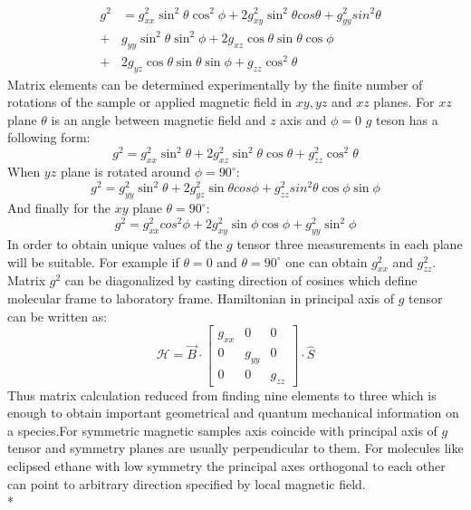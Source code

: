 \begin{equation}\label{eq:gtengeneral}
\begin{array} {lcl} &g^2& = g_{xx}^2\sin^2\theta\cos^2\phi+2g_{xy}^2\sin^2\theta cos\theta+g_{yy}^2sin^2\theta\\ & + & g_{yy}\sin^2\theta\sin^2\phi+2g_{xz}\cos\theta\sin\theta\cos\phi\\ & + & 2g_{yz}\cos\theta\sin\theta\sin\phi+g_{zz}\cos^2\theta \end{array}
\end{equation}
Matrix elements can be determined experimentally by the finite number of rotations of the sample or applied magnetic field in $xy,yz$ and $xz$ planes. For $xz$ plane $\theta$ is an angle between magnetic field and $z$ axis and $\phi=0$ $g$ teson has a following form:  
\begin{equation}\label{eq:22}
g^2=g_{xx}^2\sin^2\theta+2g_{xz}^2\sin^2\theta \cos\theta+g_{zz}^2\cos^2\theta
\end{equation} 
When $yz$ plane is rotated around $\phi=90^{\circ}$:
\begin{equation}\label{eq:newone22}
g^2=g_{yy}^2\sin^2\theta+2g_{yz}^2\sin\theta cos\phi+g_{zz}^2sin^2\theta\cos\phi\sin\phi
\end{equation} 
And finally for the $xy$ plane $\theta=90^{\circ}$:
\begin{equation}\label{eq:newone221}
g^2=g_{xx}^2cos^2\phi+2g_{xy}^2\sin\phi\cos\phi+g_{yy}^2\sin^2\phi
\end{equation} 
In order to obtain unique values of the $g$ tensor three measurements in each plane will be suitable. For example if $\theta=0$ and $\theta=90^{\circ}$ one can obtain $g^2_{xx}$ and $g^2_{zz}$. Matrix $g^2$ can be diagonalized by casting direction of cosines which define molecular frame to laboratory frame. Hamiltonian in principal axis of $g$ tensor can be written as: 
\begin{equation}\label{eq:princham}
\mathcal{H}=\vec{B}\cdot \begin{bmatrix} g_{xx} & 0 & 0 \\ 0 & g_{yy} & 0\\ 0 & 0 & g_{zz}\end{bmatrix}\cdot \hat{S}
\end{equation}   
Thus matrix calculation reduced from finding nine elements to three which is enough to obtain important geometrical and quantum mechanical information on a species.For symmetric magnetic samples axis coincide with principal axis of $g$ tensor and symmetry planes are usually perpendicular to them. For molecules like eclipsed ethane with low symmetry the principal axes orthogonal to each other can point to arbitrary direction specified by local magnetic field. \\*
